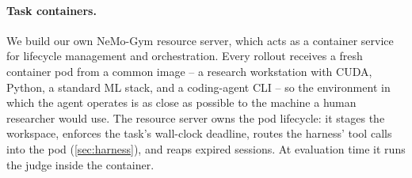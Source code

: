 \documentclass[garamond,a4paper]{inherent}
\begin{document}
\paragraph{Task containers.}
We build our own NeMo-Gym resource server, which acts as a container service for lifecycle management and orchestration. Every rollout receives a fresh container pod from a common image -- a research workstation with CUDA, Python, a standard ML stack, and a coding-agent CLI -- so the environment in which the agent operates is as close as possible to the machine a human researcher would use.
The resource server owns the pod lifecycle: it stages the workspace, enforces the task's wall-clock deadline, routes the harness' tool calls into the pod (\autoref{sec:harness}), and reaps expired sessions.
At evaluation time it runs the judge inside the container.
\end{document}
